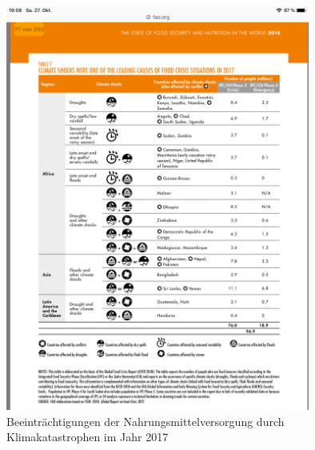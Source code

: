 \documentclass{scrartcl}
\begin{document}
\begin{figure}[htbp]
\centering
\includegraphics[width=10cm]{image_folder/beeintrachtigungklima.png}
\caption{Beeinträchtigungen der Nahrungsmittelversorgung durch Klimakatastrophen im Jahr 2017}
\label{fig:Die Grafik visualisiert den Zusammenhang zwischen Klima und Versorgung: Beeinträchtigungen der Nahrungsmittelversorgung durch Klimakatastrophen im Jahr 2017}
\end{figure}
   
\end{document}
